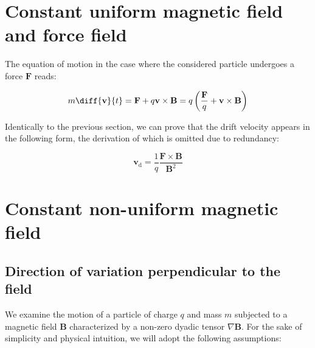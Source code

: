 \section{Constant uniform magnetic field and force field}

The equation of motion in the case where the considered particle undergoes a force $\mathbf{F}$ reads:

\begin{equation}
    m\diff{\mathbf{v}}{t}=\mathbf{F}+q\mathbf{v}\times\mathbf{B}=q\left(\frac{\mathbf{F}}{q}+\mathbf{v}\times\mathbf{B}\right)
\end{equation}

Identically to the previous section, we can prove that the drift velocity appears in the following form, the derivation of which is omitted due to redundancy:

\begin{equation}
    \label{eq2-27}
    \mathbf{v}_\mathrm{d}=\frac{1}{q}\frac{\mathbf{F}\times\mathbf{B}}{\mathbf{B}^2}
\end{equation}

\section{Constant non-uniform magnetic field}

\label{sec2-5}

\subsection{Direction of variation perpendicular to the field}

\label{sec2-5-1}

We examine the motion of a particle of charge $q$ and mass $m$ subjected to a magnetic field $\mathbf{B}$ characterized by a non-zero dyadic tensor $\nabla\mathbf{B}$. For the sake of simplicity and physical intuition, we will adopt the following assumptions:


